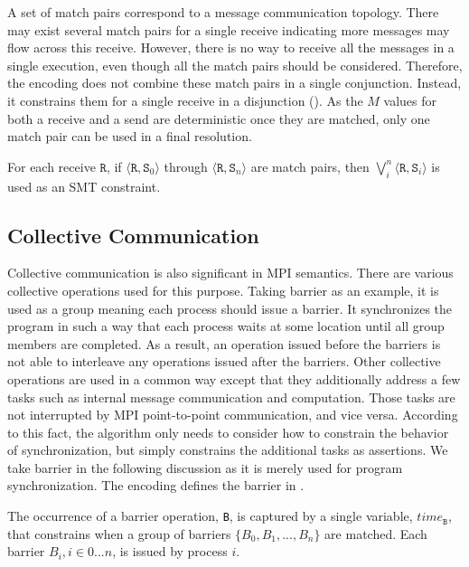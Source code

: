 A set of match pairs correspond to a message communication topology. There may exist several match pairs for a single receive indicating more messages may flow across this receive. However, there is no way to receive all the messages in a single execution, even though all the match pairs should be considered. Therefore, the encoding does not combine these match pairs in a single conjunction. Instead, it constrains them for a single receive in a disjunction (). As the $M$ values for both a receive and a send are deterministic once they are matched, only one match pair can be used in a final resolution.

\begin{definition} \label{def:receive_match}
For each receive $\mathtt{R}$, if $\langle\mathtt{R},
\mathtt{S}_0\rangle$ through $\langle\mathtt{R}, \mathtt{S}_n\rangle$
are match pairs, then $\bigvee_{i}^{n} \langle\mathtt{R},
\mathtt{S}_i\rangle$ is used as an SMT constraint.
\end{definition}

\subsection{Collective Communication}
Collective communication is also significant in MPI semantics. There are various collective operations used for this purpose.  Taking barrier as an example, it is used as a group meaning each process should issue a barrier.  It synchronizes the program in such a way that each process waits at some location until all group members are completed. As a result, an operation issued before the barriers is not able to interleave any operations issued after the barriers. Other collective operations are used in a common way except that they additionally address a few tasks such as internal message communication and computation. Those tasks are not interrupted by MPI point-to-point communication, and vice versa. According to this fact, the algorithm only needs to consider how to constrain the behavior of synchronization, but simply constrains the additional tasks as assertions. We take barrier in the following discussion as it is merely used for program synchronization. The encoding defines the barrier in . 

\begin{definition}[Barrier]\label{def:barrier}
The occurrence of a barrier operation, \texttt{B}, is captured by a
single variable, $\mathit{time}_\mathtt{B}$, that constrains when a group of barriers $\{B_0, B_1, ..., B_n\}$ are matched.  
Each barrier $B_i, i\in{0 ... n}$, is issued by process $i$. 
\end{definition}

